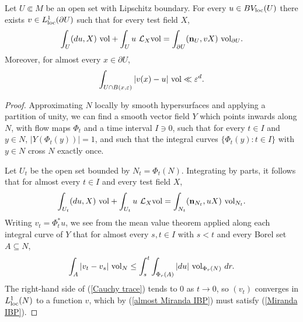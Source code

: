 \begin{proposition}\label{traces}
Let $U \Subset M$ be an open set with Lipschitz boundary.
For every $u \in BV_{\mathrm{loc}}(U)$ there exists $v \in L^1_{\mathrm{loc}}(\partial U)$ such that for every test field $X$,
\begin{equation}\label{Miranda IBP}
\int_U (du, X) ~\mathrm{vol} + \int_U u ~\mathcal L_X\mathrm{vol} = \int_{\partial U} (\mathbf n_U, vX) ~\mathrm{vol}_{\partial U}.
\end{equation}
Moreover, for almost every $x \in \partial U$,
\begin{equation}\label{convergence of trace}
\int_{U \cap B(x, \varepsilon)} |v(x) - u| ~\mathrm{vol} \ll \varepsilon^d.
\end{equation}
\end{proposition}
\begin{proof}
Approximating $N$ locally by smooth hypersurfaces and applying a partition of unity, we can find a smooth vector field $Y$ which points inwards along $N$, with flow maps $\Phi_t$ and a time interval $I \ni 0$, such that for every $t \in I$ and $y \in N$, $|Y(\Phi_t(y))| = 1$, and such that the integral curves $\{\Phi_t(y): t \in I\}$ with $y \in N$ cross $N$ exactly once.

Let $U_t$ be the open set bounded by $N_t = \Phi_t(N)$.
Integrating by parts, it follows that for almost every $t \in I$ and every test field $X$,
\begin{equation}\label{almost Miranda IBP}
\int_{U_t} (du, X) ~\mathrm{vol} + \int_{U_t} u ~\mathcal L_X\mathrm{vol} = \int_{N_t} (\mathbf n_{N_t}, uX) ~\mathrm{vol}_{N_t}.
\end{equation}
Writing $v_t = \Phi_t^* u$, we see from the mean value theorem applied along each integral curve of $Y$ that for almost every $s, t \in I$ with $s < t$ and every Borel set $A \subseteq N$,
\begin{equation}\label{Cauchy trace}
\int_A |v_t - v_s| ~\mathrm{vol}_N \leq \int_s^t \int_{\Phi_r(A)} |du| ~\mathrm{vol}_{\Phi_r(N)} ~dr.
\end{equation}
The right-hand side of (\ref{Cauchy trace}) tends to $0$ as $t \to 0$, so $(v_t)$ converges in $L^1_{\mathrm{loc}}(N)$ to a function $v$, which by (\ref{almost Miranda IBP}) must satisfy (\ref{Miranda IBP}).


\end{proof}

